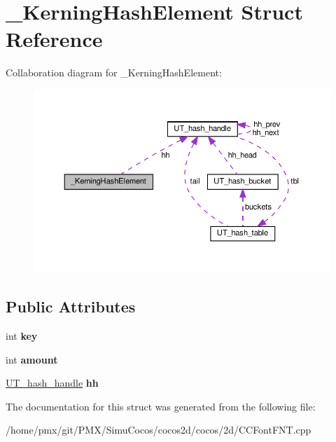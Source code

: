 \hypertarget{struct__KerningHashElement}{}\section{\+\_\+\+Kerning\+Hash\+Element Struct Reference}
\label{struct__KerningHashElement}


Collaboration diagram for \+\_\+\+Kerning\+Hash\+Element\+:
\nopagebreak
\begin{figure}[H]
\begin{center}
\leavevmode
\includegraphics[width=350pt]{struct__KerningHashElement__coll__graph}
\end{center}
\end{figure}
\subsection*{Public Attributes}
\begin{DoxyCompactItemize}
\item 
int {\bfseries key}
\item 
int {\bfseries amount}
\item 
\hyperlink{structUT__hash__handle}{U\+T\+\_\+hash\+\_\+handle} {\bfseries hh}
\end{DoxyCompactItemize}


The documentation for this struct was generated from the following file\+:\begin{DoxyCompactItemize}
\item 
/home/pmx/git/\+P\+M\+X/\+Simu\+Cocos/cocos2d/cocos/2d/C\+C\+Font\+F\+N\+T.\+cpp\end{DoxyCompactItemize}
